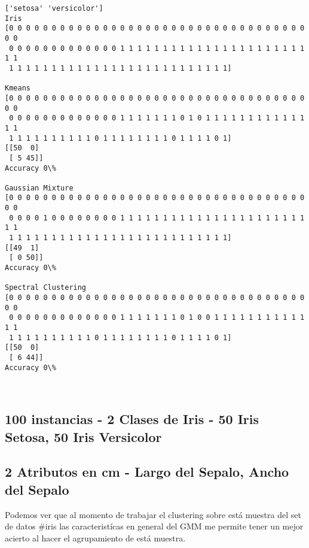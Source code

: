 \documentclass[11pt]{article}
\begin{document}
    \begin{Verbatim}[commandchars=\\\{\}]
['setosa' 'versicolor']
Iris
[0 0 0 0 0 0 0 0 0 0 0 0 0 0 0 0 0 0 0 0 0 0 0 0 0 0 0 0 0 0 0 0 0 0 0 0 0
 0 0 0 0 0 0 0 0 0 0 0 0 0 1 1 1 1 1 1 1 1 1 1 1 1 1 1 1 1 1 1 1 1 1 1 1 1
 1 1 1 1 1 1 1 1 1 1 1 1 1 1 1 1 1 1 1 1 1 1 1 1 1 1]

Kmeans
[0 0 0 0 0 0 0 0 0 0 0 0 0 0 0 0 0 0 0 0 0 0 0 0 0 0 0 0 0 0 0 0 0 0 0 0 0
 0 0 0 0 0 0 0 0 0 0 0 0 0 1 1 1 1 1 1 1 0 1 0 1 1 1 1 1 1 1 1 1 1 1 1 1 1
 1 1 1 1 1 1 1 1 1 1 0 1 1 1 1 1 1 1 1 0 1 1 1 1 0 1]
[[50  0]
 [ 5 45]]
Accuracy 0\%

Gaussian Mixture
[0 0 0 0 0 0 0 0 0 0 0 0 0 0 0 0 0 0 0 0 0 0 0 0 0 0 0 0 0 0 0 0 0 0 0 0 0
 0 0 0 0 1 0 0 0 0 0 0 0 0 1 1 1 1 1 1 1 1 1 1 1 1 1 1 1 1 1 1 1 1 1 1 1 1
 1 1 1 1 1 1 1 1 1 1 1 1 1 1 1 1 1 1 1 1 1 1 1 1 1 1]
[[49  1]
 [ 0 50]]
Accuracy 0\%

Spectral Clustering
[0 0 0 0 0 0 0 0 0 0 0 0 0 0 0 0 0 0 0 0 0 0 0 0 0 0 0 0 0 0 0 0 0 0 0 0 0
 0 0 0 0 0 0 0 0 0 0 0 0 0 1 1 1 1 1 1 1 0 1 0 0 1 1 1 1 1 1 1 1 1 1 1 1 1
 1 1 1 1 1 1 1 1 1 1 0 1 1 1 1 1 1 1 1 0 1 1 1 1 0 1]
[[50  0]
 [ 6 44]]
Accuracy 0\%

    \end{Verbatim}

    \begin{center}
    \end{center}
    { \hspace*{\fill} \\}
    
    \subsection{100 instancias - 2 Clases de Iris - 50 Iris Setosa, 50 Iris
Versicolor}\label{instancias---2-clases-de-iris---50-iris-setosa-50-iris-versicolor}

\subsection{2 Atributos en cm - Largo del Sepalo, Ancho del
Sepalo}\label{atributos-en-cm---largo-del-sepalo-ancho-del-sepalo}

Podemos ver que al momento de trabajar el clustering sobre está muestra
del set de datos \#iris las caracteristícas en general del GMM me
permite tener un mejor acierto al hacer el agrupamiento de está muestra.
\end{document}
